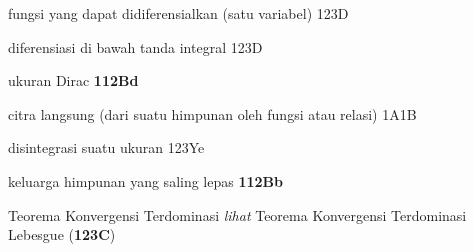 

fungsi yang dapat didiferensialkan (satu variabel) 123D



diferensiasi di bawah tanda integral 123D













ukuran Dirac {\bf 112Bd}

citra langsung (dari suatu himpunan oleh fungsi atau relasi) 1A1B


























disintegrasi suatu ukuran 123Ye


keluarga himpunan yang saling lepas {\bf 112Bb}







































Teorema Konvergensi Terdominasi {\it lihat} Teorema Konvergensi Terdominasi Lebesgue
({\bf 123C})




